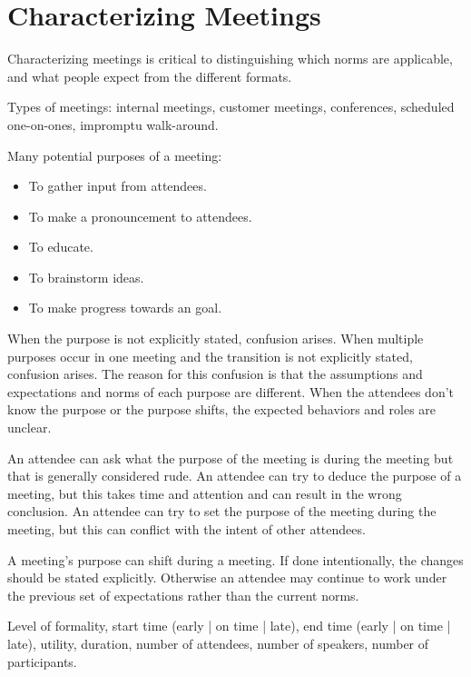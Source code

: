 \section{Characterizing Meetings}
Characterizing meetings is critical to distinguishing which norms are applicable, and what people expect from the different formats. 



Types of meetings: internal meetings, customer meetings, conferences, scheduled one-on-ones, impromptu walk-around.   


Many potential purposes of a meeting:
\begin{itemize}
    \item To gather input from attendees.
    \item To make a pronouncement to attendees.
    \item To educate.
    \item To brainstorm ideas.
    \item To make progress towards an goal.
\end{itemize}
When the purpose is not explicitly stated, confusion arises. 
When multiple purposes occur in one meeting and the transition is not explicitly stated, confusion arises.
The reason for this confusion is that the assumptions and expectations and norms of each purpose are different. When the attendees don't know the purpose or the purpose shifts, the expected behaviors and roles are unclear. 

An attendee can ask what the purpose of the meeting is during the meeting but that is generally considered rude. An attendee can try to deduce the purpose of a meeting, but this takes time and attention and can result in the wrong conclusion. An attendee can try to set the purpose of the meeting during the meeting, but this can conflict with the intent of other attendees. 

A meeting's purpose can shift during a meeting. If done intentionally, the changes should be stated explicitly. Otherwise an attendee may continue to work under the previous set of expectations rather than the current norms. 



Level of formality, start time (early | on time | late), 
end time (early | on time | late), utility, 
duration, number of attendees, number of speakers, number of participants.



